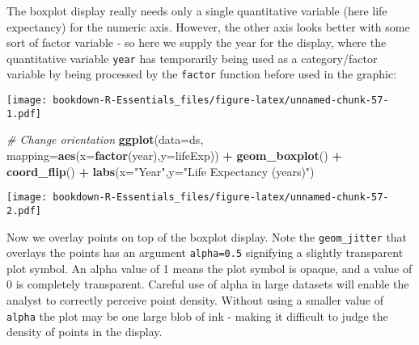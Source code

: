 \documentclass[
]{book}
\newenvironment{Shaded}{\begin{snugshade}}{\end{snugshade}}
\newcommand{\CommentTok}[1]{\textcolor[rgb]{0.56,0.35,0.01}{\textit{#1}}}
\newcommand{\DataTypeTok}[1]{\textcolor[rgb]{0.13,0.29,0.53}{#1}}
\newcommand{\DecValTok}[1]{\textcolor[rgb]{0.00,0.00,0.81}{#1}}
\newcommand{\KeywordTok}[1]{\textcolor[rgb]{0.13,0.29,0.53}{\textbf{#1}}}
\newcommand{\NormalTok}[1]{#1}
\newcommand{\OperatorTok}[1]{\textcolor[rgb]{0.81,0.36,0.00}{\textbf{#1}}}
\newcommand{\StringTok}[1]{\textcolor[rgb]{0.31,0.60,0.02}{#1}}
\begin{document}
The boxplot display really needs only a single quantitative variable (here life expectancy) for the numeric axis. However, the other axis looks better with some
sort of factor variable - so here we supply the year for the display, where the quantitative variable \texttt{year} has temporarily being used as a category/factor variable by being processed by the \texttt{factor} function before used in the graphic:

\begin{Shaded}
\end{Shaded}

\texttt{[image: bookdown-R-Essentials\_files/figure-latex/unnamed-chunk-57-1.pdf]}

\begin{Shaded}
\begin{Highlighting}[]
\CommentTok{# Change orientation}
\KeywordTok{ggplot}\NormalTok{(}\DataTypeTok{data=}\NormalTok{ds, }\DataTypeTok{mapping=}\KeywordTok{aes}\NormalTok{(}\DataTypeTok{x=}\KeywordTok{factor}\NormalTok{(year),}\DataTypeTok{y=}\NormalTok{lifeExp)) }\OperatorTok{+}
\StringTok{ }\KeywordTok{geom_boxplot}\NormalTok{() }\OperatorTok{+}\StringTok{ }
\StringTok{  }\KeywordTok{coord_flip}\NormalTok{() }\OperatorTok{+}\StringTok{ }
\StringTok{  }\KeywordTok{labs}\NormalTok{(}\DataTypeTok{x=}\StringTok{"Year"}\NormalTok{,}\DataTypeTok{y=}\StringTok{"Life Expectancy (years)"}\NormalTok{)}
\end{Highlighting}
\end{Shaded}

\texttt{[image: bookdown-R-Essentials\_files/figure-latex/unnamed-chunk-57-2.pdf]}

Now we overlay points on top of the boxplot display. Note the \texttt{geom\_jitter} that overlays the points has an argument \texttt{alpha=0.5} signifying a slightly transparent plot symbol. An alpha value of 1 means the plot symbol is opaque, and a value of 0 is completely transparent. Careful use of alpha in large datasets will enable the analyst to correctly perceive point density. Without using a smaller value of \texttt{alpha} the plot may be one large blob of ink - making it difficult to judge the density of points in the display.
\end{document}

